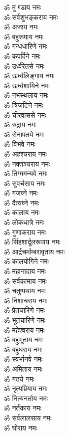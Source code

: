 \begin{multicols}{2}
\begin{flushleft}
ॐ मु ण्डाय नमः\\
ॐ सर्वशुभङ्कराय नमः\\
ॐ अजाय नमः\\
ॐ बहुरूपाय नमः\\
ॐ गन्धधारिणे नमः\\
ॐ कपर्दिने नमः\\
ॐ उर्ध्वरेतसे नमः\\
ॐ ऊर्ध्वलिङ्गाय नमः\\
ॐ ऊर्ध्वशायिने नमः\\
ॐ नभस्थलाय नमः\hfill{}\\
ॐ त्रिजटिने नमः\\
ॐ चीरवाससे नमः\\
ॐ रुद्राय नमः\\
ॐ सेनापतये नमः\\
ॐ विभवे नमः\\
ॐ अहश्चराय नमः\\
ॐ नक्तञ्चराय नमः\\
ॐ तिग्ममन्यवे नमः\\
ॐ सुवर्चसाय नमः\\
ॐ गजघ्ने नमः\hfill{}\\
ॐ दैत्यघ्ने नमः\\
ॐ कालाय नमः\\
ॐ लोकधात्रे नमः\\
ॐ गुणाकराय नमः\\
ॐ सिंहशार्दूलरूपाय नमः\\
ॐ आर्द्रचर्माम्बरावृताय नमः\\
ॐ कालयोगिने नमः\\
ॐ महानादाय नमः\\
ॐ सर्वकामाय नमः\\
ॐ चतुष्पथाय नमः\hfill{}\\
ॐ निशाचराय नमः\\
ॐ प्रेतचारिणे नमः\\
ॐ भूतचारिणे नमः\\
ॐ महेश्वराय नमः\\
ॐ बहुभूताय नमः\\
ॐ बहुधराय नमः\\
ॐ स्वर्भानवे नमः\\
ॐ अमिताय नमः\\
ॐ गतये नमः\\
ॐ नृत्यप्रियाय नमः\hfill{}\\
ॐ नित्यनर्ताय नमः\\
ॐ नर्तकाय नमः\\
ॐ सर्वलालसाय नमः\\
ॐ घोराय नमः\\

\end{flushleft}
\end{multicols}

